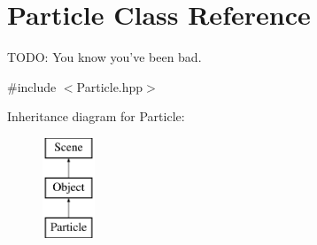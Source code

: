 \hypertarget{class_particle}{\section{Particle Class Reference}
\label{class_particle}
}


T\-O\-D\-O\-: You know you've been bad.  




{\ttfamily \#include $<$Particle.\-hpp$>$}

Inheritance diagram for Particle\-:\begin{figure}[H]
\begin{center}
\leavevmode
\includegraphics[height=3.000000cm]{class_particle}
\end{center}
\end{figure}
